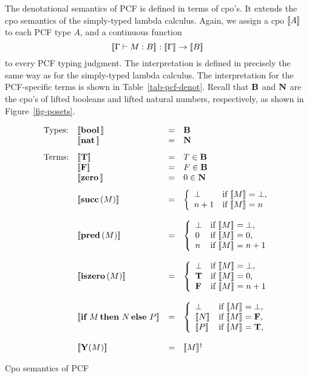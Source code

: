\documentclass{article}
\begin{document}
The denotational semantics of PCF is defined in terms of cpo's. It
extends the cpo semantics of the simply-typed lambda calculus. Again,
we assign a cpo $[\![A]\!]_{}$ to each PCF type $A$, and a continuous
function 
\[ [\![\Gamma\vdash M:B]\!]_{} : [\![\Gamma]\!]_{} \to [\![B]\!]_{}
\]
to every PCF typing judgment. The interpretation is defined in
precisely the same way as for the simply-typed lambda calculus. The
interpretation for the PCF-specific terms is shown in
Table~\ref{tab-pcf-denot}. Recall that ${\bf B}$ and ${\bf N}$ are the cpo's of
lifted booleans and lifted natural numbers, respectively, as shown in
Figure~\ref{fig-posets}.
\begin{table}
\[ \begin{array}{llll}
  \mbox{Types:} 
  &  \semm{\boolt} &=& \Bb \\
  &  \semm{\natt}  &=& \Nn  \nl
  \mbox{Terms:} 
  & \semm{\truet} &=& T\in\Bb \\
  & \semm{\falset} &=& F\in\Bb \\
  & \semm{\zerot} &=& 0\in\Nn \nl
  & \semm{\succt(M)} &=& \left\{\begin{array}{ll}
      \bot & \mbox{if $\semm{M} = \bot$,} \\
      n+1  & \mbox{if $\semm{M} = n$}
    \end{array}\right. \\\\
  & \semm{\predt(M)} &=& \left\{\begin{array}{ll}
      \bot & \mbox{if $\semm{M} = \bot$,} \\
      0    & \mbox{if $\semm{M} = 0$,} \\
      n    & \mbox{if $\semm{M} = n+1$}
    \end{array}\right. \\\\
  & \semm{\iszerot(M)} &=& \left\{\begin{array}{ll}
      \bot     & \mbox{if $\semm{M} = \bot$,} \\
      \truet   & \mbox{if $\semm{M} = 0$,} \\
      \falset  & \mbox{if $\semm{M} = n+1$}
    \end{array}\right. \\\\
  & \semm{\ite{M}{N}{P}} &=& \left\{\begin{array}{ll}
      \bot        & \mbox{if $\semm{M} = \bot$,} \\
      \semm{N}    & \mbox{if $\semm{M} = \falset$,} \\
      \semm{P}    & \mbox{if $\semm{M} = \truet$,} \\
    \end{array}\right. \\\\
  & \semm{\Y(M)} &=& \semm{M}^{\dagger}
\end{array}
\]
\caption{Cpo semantics of PCF}\label{tab-pcf-denot}
\end{table}
\end{document}
